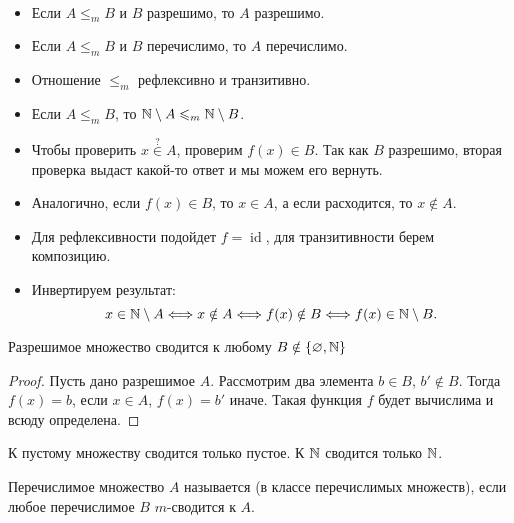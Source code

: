 \begin{prop}
	~\begin{itemize}
		\item Если $ A \le _{m} B$ и $ B$ разрешимо, то $ A$ разрешимо.
		\item Если $ A \le _{m} B$ и $ B$ перечислимо, то $ A$ перечислимо.
		\item Отношение $ \le _{m}$ рефлексивно и транзитивно.
		\item Если $ A \le _{m} B$, то $ \mathbb{N} \setminus A \leqslant _{m} \mathbb{N} \setminus B$.
	\end{itemize}
\end{prop}
\begin{proof*}
	\begin{itemize}
		\item Чтобы  проверить $ x \stackrel{?}{\in} A$, проверим $ f(x) \in B$. Так как $ B$ разрешимо, вторая проверка выдаст какой-то ответ и мы можем его вернуть.
		\item Аналогично, если $ f(x) \in B$, то $ x \in A$, а если расходится, то $ x \notin A$.
		\item Для рефлексивности подойдет $ f = \operatorname{id}$, для транзитивности берем композицию. 
		\item Инвертируем результат:
			\[
				x \in \mathbb{N} \setminus A \Longleftrightarrow x \notin A \Longleftrightarrow f(x) \notin B \Longleftrightarrow f(x) \in \mathbb{N} \setminus B
			.\] 
	\end{itemize}
\end{proof*}
\begin{note}
    Разрешимое множество сводится к любому $ B \notin \{\varnothing, \mathbb{N}\}$
\end{note}
\begin{proof}
Пусть дано разрешимое $A$. Рассмотрим два элемента $b \in B$, $b' \notin B$. Тогда $f(x) = b$, если $x \in A$, $f(x) = b'$ иначе. Такая функция $f$ будет вычислима и всюду определена.
\end{proof}
\begin{note}
    К пустому множеству сводится только пустое. К $ \mathbb{N}$ сводится только $ \mathbb{N}$.
\end{note}


\begin{defn}[$ m$-полнота]
	Перечислимое множество $ A$ называется  (в классе перечислимых множеств), если любое перечислимое $ B$  $ m$-сводится к $ A$.
\end{defn}

